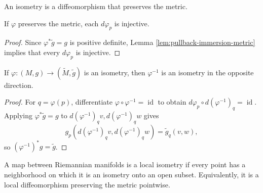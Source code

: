 \begin{definition}[Isometry]
\label{def:isometry}
\leanok
{}
An isometry is a diffeomorphism that preserves the metric.
\end{definition}

\begin{lemma}
\label{lem:metric-preserving-immersion}
\leanok
{}
If $\varphi$ preserves the metric, each $d\varphi_p$ is injective.
\end{lemma}
\begin{proof}
\leanok
{}
\sketch Since $\varphi^*\widetilde g=g$ is positive definite, Lemma \ref{lem:pullback-immersion-metric} implies that every $d\varphi_p$ is injective.
\end{proof}

\begin{lemma}
\label{lem:isometry-symm}
\leanok
{}
If $\varphi:(M,g)\to(\widetilde M,\widetilde g)$ is an isometry, then $\varphi^{-1}$ is an isometry in the opposite direction.
\end{lemma}
\begin{proof}
\leanok
{}
\sketch For $q=\varphi(p)$, differentiate $\varphi\circ\varphi^{-1}=\operatorname{id}$ to obtain $d\varphi_p\circ d(\varphi^{-1})_q=\operatorname{id}$. Applying $\varphi^*\widetilde g=g$ to $d(\varphi^{-1})_qv,d(\varphi^{-1})_qw$ gives
\[
g_p(d(\varphi^{-1})_qv,d(\varphi^{-1})_qw)=\widetilde g_q(v,w),
\]
so $(\varphi^{-1})^*g=\widetilde g$.
\end{proof}

\begin{definition}
\label{def:local-isometry}
\leanok
{}
A map between Riemannian manifolds is a local isometry if every point has a neighborhood on which it is an isometry onto an open subset. Equivalently, it is a local diffeomorphism preserving the metric pointwise.
\end{definition}

